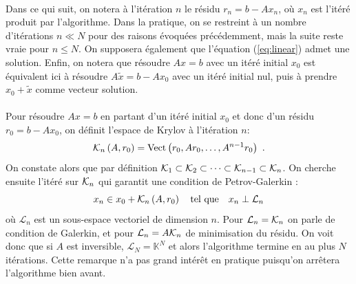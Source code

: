 	\paragraph{}
	Dans ce qui suit, on notera à l'itération $n$ le résidu $r_n = b - Ax_n$, où $x_n$ est l'itéré produit par l'algorithme.
	Dans la pratique, on se restreint à un nombre d'itérations $n\ll N$ pour des raisons évoquées précédemment, mais la suite reste vraie pour $n\le N$.
	On supposera également que l'équation (\ref{eq:linear}) admet une solution.
	Enfin, on notera que résoudre $Ax = b$ avec un itéré initial $x_0$ est équivalent ici à résoudre $A\tilde{x} = b - Ax_0$ avec un itéré initial nul, puis à prendre $x_0 + \tilde{x}$ comme vecteur solution.

	\paragraph{}
	Pour résoudre $Ax = b$ en partant d'un itéré initial $x_0$ et donc d'un résidu $r_0 = b - Ax_0$, on définit l'espace de Krylov à l'itération $n$:
	\begin{equation}\label{eqn:krylov}
		\krylov[A, r_0]{n} = \operatorname{Vect}\left(r_0, Ar_0, \dots, A^{n-1}r_0\right)\ .
	\end{equation}
	On constate alors que par définition $\krylov{1}\subset\krylov{2}\subset\dots\subset\krylov{n-1}\subset\krylov{n}$.
	On cherche ensuite l'itéré sur $\krylov{n}$ qui garantit une condition de Petrov-Galerkin \cite{SimonciniSzyld2007} :
	\begin{equation}\label{eqn:x_n}
		x_n \in x_0 + \krylov[A, r_0]{n}\quad\textrm{tel que}\quad x_n \perp \mathcal{L}_n
	\end{equation}
	où $\mathcal{L}_n$ est un sous-espace vectoriel de dimension $n$.
	Pour $\mathcal{L}_n = \krylov{n}$ on parle de condition de Galerkin, et pour $\mathcal{L}_n = A\krylov{n}$ de minimisation du résidu.
	On voit donc que si $A$ est inversible, $\mathcal{L}_N = \mathbb{K}^N$ et alors l'algorithme termine en au plus $N$ itérations.
	Cette remarque n'a pas grand intérêt en pratique puisqu'on arrêtera l'algorithme bien avant.

